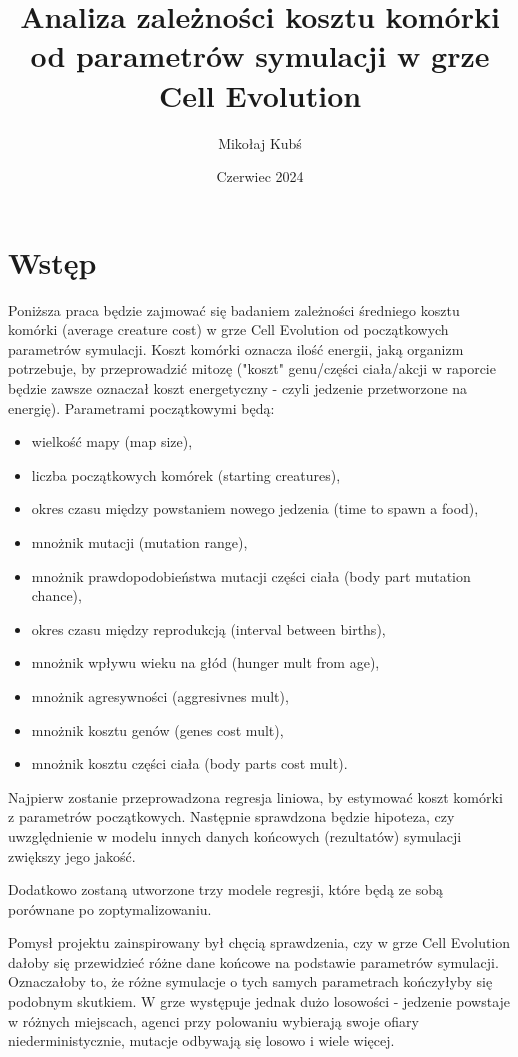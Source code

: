 \documentclass{article}
\title{Analiza zależności kosztu komórki od parametrów symulacji w grze Cell Evolution}
\author{Mikołaj Kubś}
\date{Czerwiec 2024}
\begin{document}
\maketitle
\tableofcontents

\newpage

\section{Wstęp}
Poniższa praca będzie zajmować się badaniem zależności średniego kosztu komórki (average creature cost) w grze Cell Evolution od początkowych parametrów symulacji. Koszt komórki oznacza ilość energii, jaką organizm potrzebuje, by przeprowadzić mitozę ("koszt" genu/części ciała/akcji w raporcie będzie zawsze oznaczał koszt energetyczny - czyli jedzenie przetworzone na energię). Parametrami początkowymi będą:
\begin{itemize}[itemsep=0mm]
    \item wielkość mapy (map size),
    \item liczba początkowych komórek (starting creatures),
    \item okres czasu między powstaniem nowego jedzenia (time to spawn a food),
    \item mnożnik mutacji (mutation range),
    \item mnożnik prawdopodobieństwa mutacji części ciała (body part mutation chance),
    \item okres czasu między reprodukcją (interval between births),
    \item mnożnik wpływu wieku na głód (hunger mult from age),
    \item mnożnik agresywności (aggresivnes mult),
    \item mnożnik kosztu genów (genes cost mult),
    \item mnożnik kosztu części ciała (body parts cost mult).
\end{itemize}
Najpierw zostanie przeprowadzona regresja liniowa, by estymować koszt komórki z parametrów początkowych. Następnie sprawdzona będzie hipoteza, czy uwzględnienie w modelu innych danych końcowych (rezultatów) symulacji zwiększy jego jakość.

Dodatkowo zostaną utworzone trzy modele regresji, które będą ze sobą porównane po zoptymalizowaniu.

Pomysł projektu zainspirowany był chęcią sprawdzenia, czy w grze Cell Evolution dałoby się przewidzieć różne dane końcowe na podstawie parametrów symulacji. Oznaczałoby to, że różne symulacje o tych samych parametrach kończyłyby się podobnym skutkiem. W grze występuje jednak dużo losowości - jedzenie powstaje w różnych miejscach, agenci przy polowaniu wybierają swoje ofiary niederministycznie, mutacje odbywają się losowo i wiele więcej. 
\end{document}

